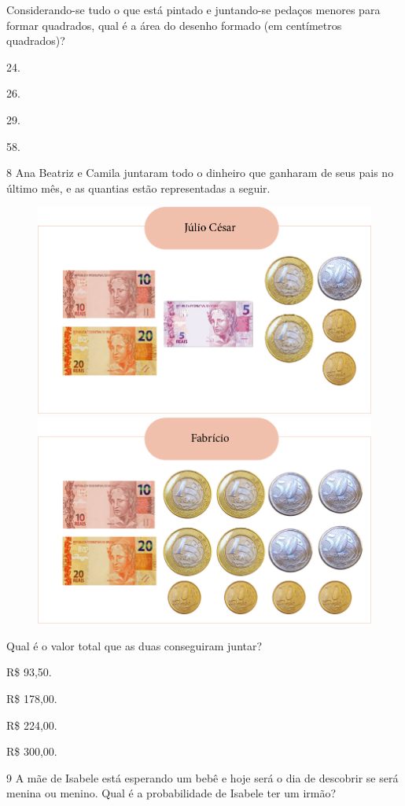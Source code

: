 Considerando-se tudo o que está pintado e juntando-se pedaços
menores para formar quadrados, qual é a área do desenho formado (em centímetros quadrados)?

\begin{escolha}
\item
  24.
\item
  26.
\item
  29.
\item
  58.
\end{escolha}


\num{8} Ana Beatriz e Camila juntaram todo o dinheiro que ganharam de seus pais no
último mês, e as quantias estão representadas a seguir.

\begin{figure}[htpb!]
\includegraphics[width=.5\textwidth]{media/image78a.png}
\includegraphics[width=.5\textwidth]{media/image78b.png}
\end{figure}

Qual é o valor total que as duas conseguiram juntar?

\begin{escolha}
\item
  R\$ 93,50.
\item
  R\$ 178,00.
\item
  R\$ 224,00.
\item
  R\$ 300,00.
\end{escolha}


\num{9} A mãe de Isabele está esperando um bebê e hoje será o dia de descobrir
se será menina ou menino. Qual é a probabilidade de Isabele ter um irmão?

